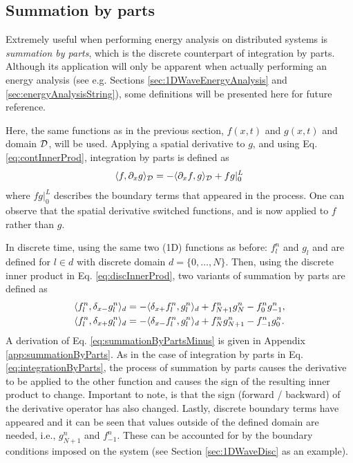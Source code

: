 \subsection{Summation by parts}\label{sec:summationByParts}
Extremely useful when performing energy analysis on distributed systems is \textit{summation by parts}, which is the discrete counterpart of integration by parts. Although its application will only be apparent when actually performing an energy analysis (see e.g. Sections \ref{sec:1DWaveEnergyAnalysis} and \ref{sec:energyAnalysisString}), some definitions will be presented here for future reference.

Here, the same functions as in the previous section, $f(x,t)$ and $g(x,t)$ and domain $\mathcal{D}$, will be used. Applying a spatial derivative to $g$, and using Eq. \eqref{eq:contInnerProd}, integration by parts is defined as
\begin{equation}\label{eq:integrationByParts}
    \langle f, \partial_x g \rangle_{\mathcal{D}} = -\langle \partial_x f, g\rangle_{\mathcal{D}} + fg|_0^L
\end{equation}
where $fg|_0^L$ describes the boundary terms that appeared in the process. One can observe that the spatial derivative switched functions, and is now applied to $f$ rather than $g$.

In discrete time, using the same two (1D) functions as before: $f_l^n$ and $g_l$ and are defined for $l\in d$ with discrete domain $d=\{0, \hdots, N\}$. Then, using the discrete inner product in Eq. \eqref{eq:discInnerProd}, two variants of summation by parts are defined as
\begin{subequations}\label{eq:summationByParts}
    \begin{align}
        \langle f_l^n, \delta_{x-} g_l^n \rangle_d  &= -\langle \delta_{x+} f_l^n, g_l^n\rangle_d + f_{N+1}^ng_N^n - f_0^ng_{-1}^n,\label{eq:summationByPartsMinus}\\
        \langle f_l^n, \delta_{x+} g_l^n \rangle_d 
        &= -\langle \delta_{x-} f_l^n, g_l^n\rangle_d + f_N^ng_{N+1}^n - f_{-1}^ng_0^n.\label{eq:summationByPartsPlus}
    \end{align}
\end{subequations}
A derivation of Eq. \eqref{eq:summationByPartsMinus} is given in Appendix \ref{app:summationByParts}. As in the case of integration by parts in Eq. \eqref{eq:integrationByParts}, the process of summation by parts causes the derivative to be applied to the other function and causes the sign of the resulting inner product to change. Important to note, is that the sign (forward / backward) of the derivative operator has also changed. Lastly, discrete boundary terms have appeared and it can be seen that values outside of the defined domain are needed, i.e., $g_{N+1}^n$ and $f_{-1}^n$. These can be accounted for by the boundary conditions imposed on the system (see Section \ref{sec:1DWaveDisc} as an example). 

